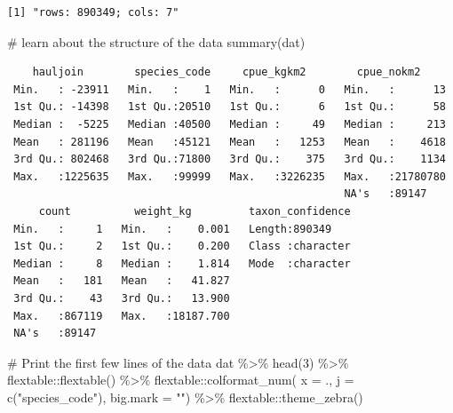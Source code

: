 \documentclass[
  letterpaper,
  oneside,
  open=any]{scrbook}
\newenvironment{Shaded}{\begin{snugshade}}{\end{snugshade}}
\newcommand{\AttributeTok}[1]{\textcolor[rgb]{0.40,0.45,0.13}{#1}}
\newcommand{\CommentTok}[1]{\textcolor[rgb]{0.37,0.37,0.37}{#1}}
\newcommand{\DecValTok}[1]{\textcolor[rgb]{0.68,0.00,0.00}{#1}}
\newcommand{\FunctionTok}[1]{\textcolor[rgb]{0.28,0.35,0.67}{#1}}
\newcommand{\NormalTok}[1]{\textcolor[rgb]{0.00,0.23,0.31}{#1}}
\newcommand{\SpecialCharTok}[1]{\textcolor[rgb]{0.37,0.37,0.37}{#1}}
\newcommand{\StringTok}[1]{\textcolor[rgb]{0.13,0.47,0.30}{#1}}
\begin{document}
\begin{verbatim}
[1] "rows: 890349; cols: 7"
\end{verbatim}

\begin{Shaded}
\begin{Highlighting}[]
\CommentTok{\# learn about the structure of the data}
\FunctionTok{summary}\NormalTok{(dat)}
\end{Highlighting}
\end{Shaded}

\begin{verbatim}
    hauljoin        species_code     cpue_kgkm2        cpue_nokm2      
 Min.   : -23911   Min.   :    1   Min.   :      0   Min.   :      13  
 1st Qu.: -14398   1st Qu.:20510   1st Qu.:      6   1st Qu.:      58  
 Median :  -5225   Median :40500   Median :     49   Median :     213  
 Mean   : 281196   Mean   :45121   Mean   :   1253   Mean   :    4618  
 3rd Qu.: 802468   3rd Qu.:71800   3rd Qu.:    375   3rd Qu.:    1134  
 Max.   :1225635   Max.   :99999   Max.   :3226235   Max.   :21780780  
                                                     NA's   :89147     
     count          weight_kg         taxon_confidence  
 Min.   :     1   Min.   :    0.001   Length:890349     
 1st Qu.:     2   1st Qu.:    0.200   Class :character  
 Median :     8   Median :    1.814   Mode  :character  
 Mean   :   181   Mean   :   41.827                     
 3rd Qu.:    43   3rd Qu.:   13.900                     
 Max.   :867119   Max.   :18187.700                     
 NA's   :89147                                          
\end{verbatim}

\begin{Shaded}
\begin{Highlighting}[]
\CommentTok{\# Print the first few lines of the data }
\NormalTok{dat }\SpecialCharTok{\%\textgreater{}\%} 
  \FunctionTok{head}\NormalTok{(}\DecValTok{3}\NormalTok{) }\SpecialCharTok{\%\textgreater{}\%} 
\NormalTok{  flextable}\SpecialCharTok{::}\FunctionTok{flextable}\NormalTok{() }\SpecialCharTok{\%\textgreater{}\%}
\NormalTok{  flextable}\SpecialCharTok{::}\FunctionTok{colformat\_num}\NormalTok{(}
      \AttributeTok{x =}\NormalTok{ ., }
      \AttributeTok{j =} \FunctionTok{c}\NormalTok{(}\StringTok{"species\_code"}\NormalTok{), }
      \AttributeTok{big.mark =} \StringTok{""}\NormalTok{) }\SpecialCharTok{\%\textgreater{}\%} 
\NormalTok{  flextable}\SpecialCharTok{::}\FunctionTok{theme\_zebra}\NormalTok{()}
\end{Highlighting}
\end{Shaded}
\end{document}
